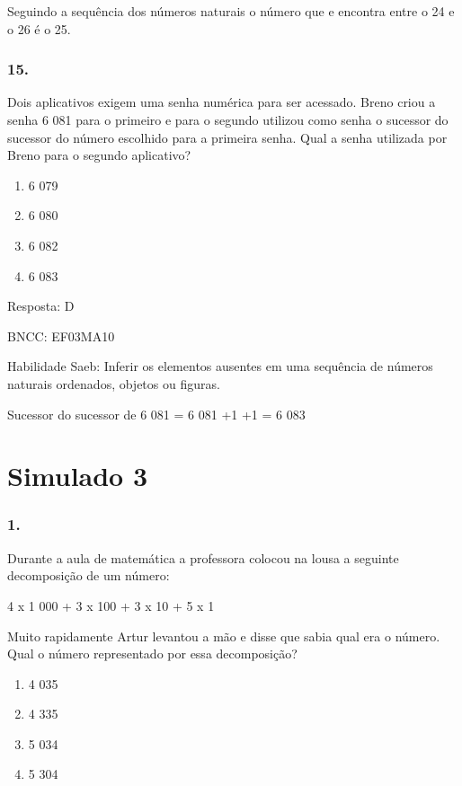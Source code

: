 Seguindo a sequência dos números naturais o número que e encontra entre
o 24 e o 26 é o 25.

\subsubsection{15.}\label{section-155}

Dois aplicativos exigem uma senha numérica para ser acessado. Breno
criou a senha 6 081 para o primeiro e para o segundo utilizou como senha
o sucessor do sucessor do número escolhido para a primeira senha. Qual a
senha utilizada por Breno para o segundo aplicativo?

\begin{enumerate}
\def\labelenumi{\alph{enumi})}
\item
  6 079
\item
  6 080
\item
  6 082
\item
  6 083
\end{enumerate}

Resposta: D

BNCC: EF03MA10

Habilidade Saeb: Inferir os elementos ausentes em uma sequência de
números naturais ordenados, objetos ou figuras.

Sucessor do sucessor de 6 081 = 6 081 +1 +1 = 6 083

\section{Simulado 3}\label{simulado-3}

\subsubsection{1. }\label{section-156}

Durante a aula de matemática a professora colocou na lousa a seguinte
decomposição de um número:

4 x 1 000 + 3 x 100 + 3 x 10 + 5 x 1

Muito rapidamente Artur levantou a mão e disse que sabia qual era o
número. Qual o número representado por essa decomposição?

\begin{enumerate}
\def\labelenumi{\alph{enumi})}
\item
  4 035
\item
  4 335
\item
  5 034
\item
  5 304
\end{enumerate}


